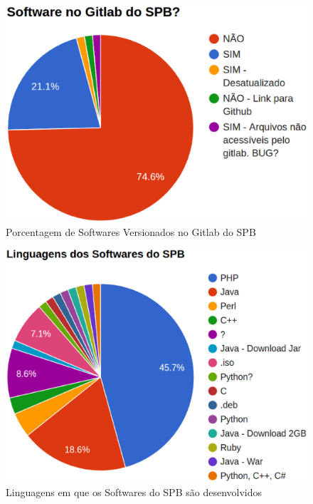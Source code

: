\begin{figure}[!htb]
	\centering
    \includegraphics[keepaspectratio=true,scale=0.5]
    {figuras/is_software_gitlab_spb.eps}
  \caption{Porcentagem de Softwares Versionados no Gitlab do SPB}
  \label{fig:is_software_gitlab_spb}
\end{figure}

\begin{figure}[!htb]
	\centering
    \includegraphics[keepaspectratio=true,scale=0.5]
    {figuras/linguagens_softwares_spb.eps}
  \caption{Linguagens em que os Softwares do SPB são desenvolvidos}
  \label{fig:linguagens_softwares_spb}
\end{figure}

\newpage

